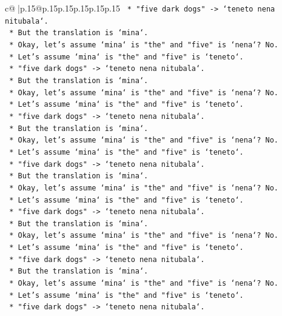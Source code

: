 \documentclass{article}
\begin{document}
{\begin{supertabular}{c@{$\;$}|p{.15\linewidth}@{}p{.15\linewidth}p{.15\linewidth}p{.15\linewidth}p{.15\linewidth}p{.15\linewidth}}
{{{\texttt{    *   "five dark dogs" {-}> `teneto nena nitubala`.} \\
\texttt{    *   But the translation is `mina`.} \\
\texttt{    *   Okay, let's assume `mina` is "the" and "five" is `nena`? No.} \\
\texttt{    *   Let's assume `mina` is "the" and "five" is `teneto`.} \\
\texttt{    *   "five dark dogs" {-}> `teneto nena nitubala`.} \\
\texttt{    *   But the translation is `mina`.} \\
\texttt{    *   Okay, let's assume `mina` is "the" and "five" is `nena`? No.} \\
\texttt{    *   Let's assume `mina` is "the" and "five" is `teneto`.} \\
\texttt{    *   "five dark dogs" {-}> `teneto nena nitubala`.} \\
\texttt{    *   But the translation is `mina`.} \\
\texttt{    *   Okay, let's assume `mina` is "the" and "five" is `nena`? No.} \\
\texttt{    *   Let's assume `mina` is "the" and "five" is `teneto`.} \\
\texttt{    *   "five dark dogs" {-}> `teneto nena nitubala`.} \\
\texttt{    *   But the translation is `mina`.} \\
\texttt{    *   Okay, let's assume `mina` is "the" and "five" is `nena`? No.} \\
\texttt{    *   Let's assume `mina` is "the" and "five" is `teneto`.} \\
\texttt{    *   "five dark dogs" {-}> `teneto nena nitubala`.} \\
\texttt{    *   But the translation is `mina`.} \\
\texttt{    *   Okay, let's assume `mina` is "the" and "five" is `nena`? No.} \\
\texttt{    *   Let's assume `mina` is "the" and "five" is `teneto`.} \\
\texttt{    *   "five dark dogs" {-}> `teneto nena nitubala`.} \\
\texttt{    *   But the translation is `mina`.} \\
\texttt{    *   Okay, let's assume `mina` is "the" and "five" is `nena`? No.} \\
\texttt{    *   Let's assume `mina` is "the" and "five" is `teneto`.} \\
\texttt{    *   "five dark dogs" {-}> `teneto nena nitubala`.} \\
}}}
\end{supertabular}}
\end{document}
